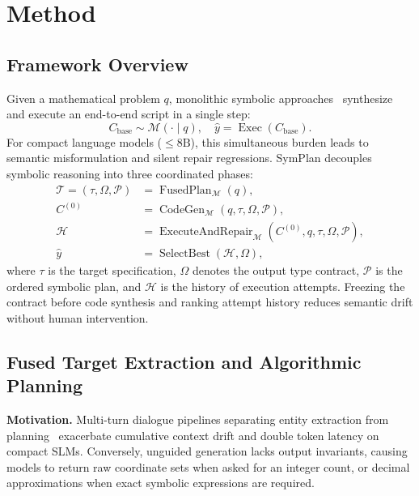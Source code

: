 \documentclass[runningheads]{llncs}
\begin{document}
\section{Method}
\label{sec:method}

\subsection{Framework Overview}

Given a mathematical problem $q$, monolithic symbolic approaches~\cite{nezhad2025symcode} synthesize and execute an end-to-end script in a single step:
\begin{equation}
C_{\text{base}} \sim \mathcal{M}(\cdot \mid q), \quad \hat{y} = \operatorname{Exec}(C_{\text{base}}).
\end{equation}
For compact language models ($\le 8\text{B}$), this simultaneous burden leads to semantic misformulation and silent repair regressions. SymPlan decouples symbolic reasoning into three coordinated phases:
\begin{align}
\mathcal{T} = (\tau, \Omega, \mathcal{P}) &= \operatorname{FusedPlan}_{\mathcal{M}}(q), \label{eq:fused_plan} \\
C^{(0)} &= \operatorname{CodeGen}_{\mathcal{M}}(q, \tau, \Omega, \mathcal{P}), \label{eq:codegen} \\
\mathcal{H} &= \operatorname{ExecuteAndRepair}_{\mathcal{M}}(C^{(0)}, q, \tau, \Omega, \mathcal{P}), \label{eq:repair} \\
\hat{y} &= \operatorname{SelectBest}(\mathcal{H}, \Omega), \label{eq:select}
\end{align}
where $\tau$ is the target specification, $\Omega$ denotes the output type contract, $\mathcal{P}$ is the ordered symbolic plan, and $\mathcal{H}$ is the history of execution attempts. Freezing the contract before code synthesis and ranking attempt history reduces semantic drift without human intervention.

\subsection{Fused Target Extraction and Algorithmic Planning}
\label{sec:fused_planning}

\textbf{Motivation.} Multi-turn dialogue pipelines separating entity extraction from planning~\cite{lyu2023faithful,khot2023decomposed} exacerbate cumulative context drift and double token latency on compact SLMs. Conversely, unguided generation lacks output invariants, causing models to return raw coordinate sets when asked for an integer count, or decimal approximations when exact symbolic expressions are required.
\end{document}

